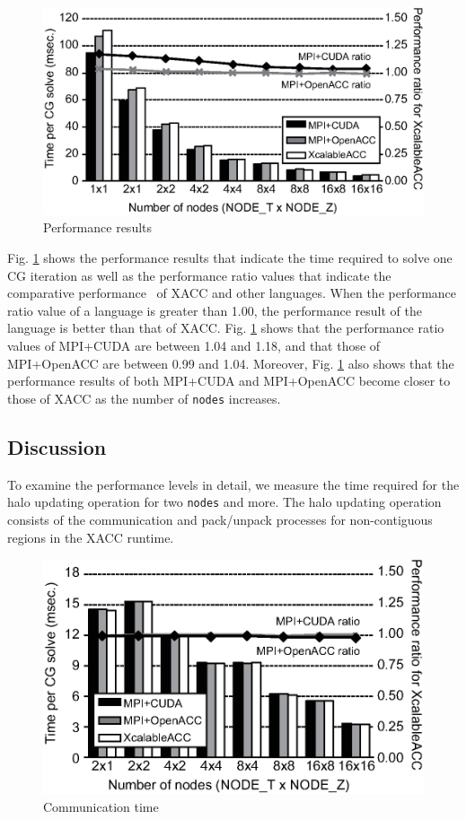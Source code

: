 \begin{figure}[h]
\centering
\includegraphics[scale=0.58,clip]{figs/performance32.eps}
\caption{Performance results} \label{fig:performance}
\end{figure}

Fig. \ref{fig:performance} shows the performance results that indicate the time required to solve one CG iteration as well as the performance ratio values that indicate the comparative performance \
of XACC and other languages.
When the performance ratio value of a language is greater than 1.00,
the performance result of the language is better than that of XACC.
Fig. \ref{fig:performance} shows that the performance ratio values of MPI+CUDA are between 1.04 and 1.18,
and that those of MPI+OpenACC are between 0.99 and 1.04.
Moreover,
Fig. \ref{fig:performance} also shows that the performance results of both MPI+CUDA and MPI+OpenACC become closer to those of XACC as the number of {\tt nodes} increases.

\subsection{Discussion}
To examine the performance levels in detail,
we measure the time required for the halo updating operation for two {\tt nodes} and more.
The halo updating operation consists of the communication and pack/unpack processes for non-contiguous regions in the XACC runtime.

\begin{figure}[h]
\centering
\includegraphics[scale=0.58,clip]{figs/halo-comm.eps}
\caption{Communication time} \label{fig:halo-comm}
\end{figure}

